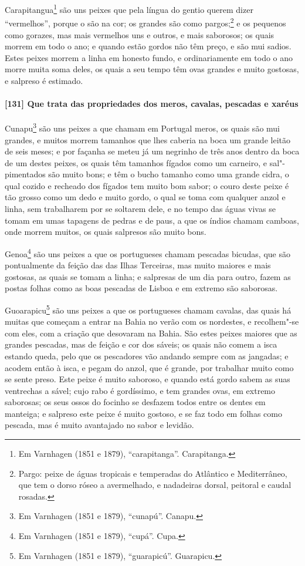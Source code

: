 \begin{linenumbers}
Carapitangua\footnote{ Em Varnhagen (1851 e 1879), ``carapitanga''. Carapitanga.} são uns
peixes que pela língua do gentio querem dizer ``vermelhos'', porque o são na cor; os
grandes são como pargos;\footnote{ Pargo: peixe de águas tropicais e temperadas do
Atlântico e Mediterrâneo, que tem o dorso róseo a avermelhado, e nadadeiras dorsal,
peitoral e caudal rosadas.} e os pequenos como gorazes, mas mais vermelhos uns e outros,
e mais saborosos; os quais morrem em todo o ano; e quando estão gordos não têm preço, e
são mui sadios. Estes peixes morrem a linha em honesto fundo, e ordinariamente em todo o
ano morre muita soma deles, os quais a seu tempo têm ovas grandes e muito gostosas, e
salpreso é estimado.

\paragraph{[131] Que trata das propriedades dos meros, cavalas, pescadas e xaréus}\quad
Cunapu\footnote{ Em Varnhagen (1851 e 1879), ``cunapú''. Canapu.} são uns peixes a que
chamam em Portugal meros, os quais são mui grandes, e muitos morrem tamanhos que lhes
caberia na boca um grande leitão de seis meses; e por façanha se meteu já um negrinho de
três anos dentro da boca de um destes peixes, os quais têm tamanhos fígados como um
carneiro, e sal"-pimentados são muito bons; e têm o bucho tamanho como uma grande cidra, o
qual cozido e recheado dos fígados tem muito bom sabor; o couro deste peixe é tão grosso
como um dedo e muito gordo, o qual se toma com qualquer anzol e linha, sem trabalharem por
se soltarem dele, e no tempo das águas vivas se tomam em umas tapagens de pedras e de
paus, a que os índios chamam camboas, onde morrem muitos, os quais salpresos são muito
bons.

Genoa\footnote{ Em Varnhagen (1851 e 1879), ``cupá''. Cupa.} são uns peixes a que os
portugueses chamam pescadas bicudas, que são pontualmente da feição das das Ilhas
Terceiras, mas muito maiores e mais gostosas, as quais se tomam a linha; e salpresas de um
dia para outro, fazem as postas folhas como as boas pescadas de Lisboa e em extremo são
saborosas.

Guoarapicu\footnote{ Em Varnhagen (1851 e 1879), ``guarapicú''. Guarapicu.} são uns peixes
a que os portugueses chamam cavalas, das quais há muitas que começam a entrar na Bahia no
verão com os nordestes, e recolhem"-se com eles, com a criação que desovaram na Bahia. São
estes peixes maiores que as grandes pescadas, mas de feição e cor dos sáveis; os quais não
comem a isca estando queda, pelo que os pescadores vão andando sempre com as jangadas; e
acodem então à isca, e pegam do anzol, que é grande, por trabalhar muito como se sente
preso. Este peixe é muito saboroso, e quando está gordo sabem as suas ventrechas a sável;
cujo rabo é gordíssimo, e tem grandes ovas, em extremo saborosas; os seus ossos do focinho
se desfazem todos entre os dentes em manteiga; e salpreso este peixe é muito gostoso, e se
faz todo em folhas como pescada, mas é muito avantajado no sabor e levidão.


\end{linenumbers}

